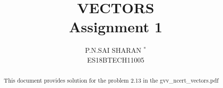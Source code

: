 \documentclass[journal,12pt,twocolumn]{IEEEtran}
\begin{document}
%


\newtheorem{theorem}{Theorem}[section]
\newtheorem{problem}{Problem}
\newtheorem{proposition}{Proposition}[section]
\newtheorem{lemma}{Lemma}[section]
\newtheorem{corollary}[theorem]{Corollary}
\newtheorem{example}{Example}[section]
\newtheorem{definition}[problem]{Definition}
\newcommand{\BEQA}{\begin{eqnarray}}
\newcommand{\EEQA}{\end{eqnarray}}
\newcommand{\define}{\stackrel{\triangle}{=}}

\providecommand{\mbf}{\mathbf}
\providecommand{\pr}[1]{\ensuremath{\Pr\left(#1\right)}}
\providecommand{\qfunc}[1]{\ensuremath{Q\left(#1\right)}}
\providecommand{\sbrak}[1]{\ensuremath{{}\left[#1\right]}}
\providecommand{\lsbrak}[1]{\ensuremath{{}\left[#1\right.}}
\providecommand{\rsbrak}[1]{\ensuremath{{}\left.#1\right]}}
\providecommand{\brak}[1]{\ensuremath{\left(#1\right)}}
\providecommand{\lbrak}[1]{\ensuremath{\left(#1\right.}}
\providecommand{\rbrak}[1]{\ensuremath{\left.#1\right)}}
\providecommand{\cbrak}[1]{\ensuremath{\left\{#1\right\}}}
\providecommand{\lcbrak}[1]{\ensuremath{\left\{#1\right.}}
\providecommand{\rcbrak}[1]{\ensuremath{\left.#1\right\}}}
\theoremstyle{remark}
\newtheorem{rem}{Remark}
\newcommand{\sgn}{\mathop{\mathrm{sgn}}}



\providecommand{\fourier}{\overset{\mathcal{F}}{ \rightleftharpoons}}
\providecommand{\system}{\overset{\mathcal{H}}{ \longleftrightarrow}}
\newcommand{\solution}{\noindent \textbf{Solution: }}
\newcommand{\cosec}{\,\text{cosec}\,}
\providecommand{\dec}[2]{\ensuremath{\overset{#1}{\underset{#2}{\gtrless}}}}
\newcommand{\myvec}[1]{\ensuremath{\begin{pmatrix}#1\end{pmatrix}}}
\newcommand{\cmyvec}[1]{\ensuremath{\begin{pmatrix*}[c]#1\end{pmatrix*}}}
\newcommand{\mydet}[1]{\ensuremath{\begin{vmatrix}#1\end{vmatrix}}}
\newcommand{\proj}[2]{\textbf{proj}_{\vec{#1}}\vec{#2}}
\let\StandardTheFigure\thefigure
\let\vec\mathbf
\title{
VECTORS\\ Assignment 1
}
\author{ P.N.SAI SHARAN $^{*}$%
	\\ ES18BTECH11005
	
}	
\maketitle
\renewcommand{\thefigure}{\theenumi}
\renewcommand{\thetable}{\theenumi}
\begin{abstract}
This document provides  solution for the problem 2.13 in the gvv\_ncert\_vectors.pdf
\end{abstract}
\end{document}
